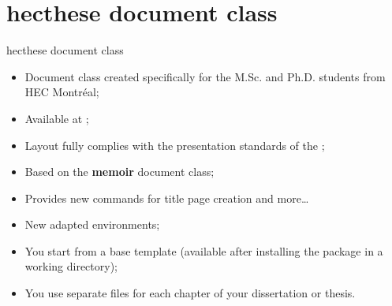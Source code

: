 
\section{hecthese document class}

\begin{frame}{hecthese document class}
	\begin{itemize}
		\item Document class created specifically for the M.Sc. and Ph.D. students from
			HEC Montréal;
		\item Available at ;
		\item Layout fully complies with the presentation standards of the 
			;
		\item Based on the \textbf{memoir} document class;
		\item Provides new commands for title page creation and more\ldots
		\item New adapted environments;
		\item You start from a base template (available after installing the package in a working directory);
		\item You use separate files for each chapter of your dissertation or thesis.
	\end{itemize}
\end{frame}